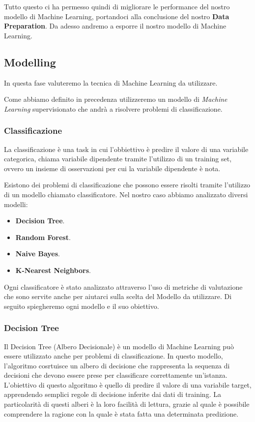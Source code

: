 \documentclass[12pt]{article}
\begin{document}
Tutto questo ci ha permesso quindi di migliorare le performance del nostro modello di Machine Learning, portandoci alla conclusione del nostro \textbf{Data Preparation}. Da adesso andremo a esporre il nostro modello di
Machine Learning.

\subsection{Modelling}
In questa fase valuteremo la tecnica di Machine Learning da utilizzare.

Come abbiamo definito in precedenza utilizzeremo un modello di \textit{Machine Learning} supervisionato che andrà a risolvere problemi
di classificazione.

\subsubsection{Classificazione}
La classificazione è una task in cui l'obbiettivo è predire il valore di una variabile categorica, chiama variabile
dipendente tramite l'utilizzo di un training set, ovvero un insieme di osservazioni per cui la variabile dipendente è nota.
\par
Esistono dei problemi di classificazione che possono essere risolti tramite l'utilizzo di un modello chiamato classificatore. Nel nostro caso abbiamo analizzato diversi modelli:

\begin{itemize}
    \item \textbf{Decision Tree}.
    \item \textbf{Random Forest}.
    \item \textbf{Naive Bayes}.
    \item \textbf{K-Nearest Neighbors}.
\end{itemize}
Ogni classificatore è stato analizzato attraverso l'uso di metriche di valutazione che sono servite anche per aiutarci sulla scelta del Modello da utilizzare. 
Di seguito spiegheremo ogni modello e il suo obiettivo.

\subsubsection{Decision Tree}
Il Decision Tree (Albero Decisionale) è un modello di Machine Learning può essere utilizzato anche per problemi di  classificazione. In questo modello, l'algoritmo cosrtuisce un albero di decisione che rappresenta
la sequenza di decisioni che devono essere prese per classificare correttamente un'istanza. L'obiettivo di questo algoritmo è quello di predire il valore di una variabile target, apprendendo semplici regole di decisione inferite dai dati di training.
La particolarità di questi alberi è la loro facilità di lettura, grazie al quale è possibile comprendere la ragione con la quale è stata fatta una determinata predizione. 
\end{document}
